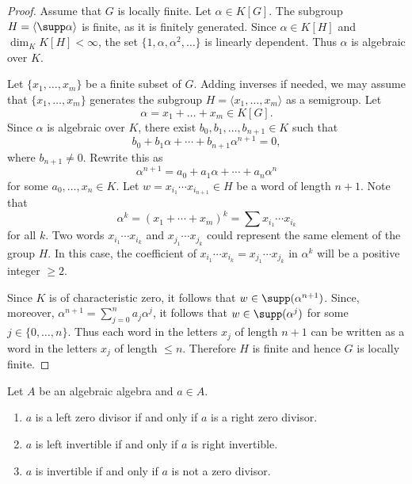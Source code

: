 \begin{proof}
	Assume that $G$ is locally finite. Let $\alpha\in K[G]$. The subgroup 
	$H=\langle\supp\alpha\rangle$ is finite, as it is finitely generated. Since 
	$\alpha\in K[H]$ and $\dim_KK[H]<\infty$, the set 
	$\{1,\alpha,\alpha^2,\dots\}$ is linearly dependent. Thus $\alpha$ is
	algebraic over $K$.

	Let $\{x_1,\dots,x_m\}$ be a finite subset of $G$. Adding inverses if needed,
	we may assume that $\{x_1,\dots,x_m\}$ generates the subgroup 
	$H=\langle x_1,\dots,x_m\rangle$ as a semigroup. Let 
	\[
	\alpha=x_1+\dots+x_m\in K[G].
	\]
	Since $\alpha$ is algebraic over $K$, 
	there exist $b_0,b_1,\dots,b_{n+1}\in K$ such that 
	\[
	b_0+b_1\alpha+\cdots+b_{n+1}\alpha^{n+1}=0,
	\]
	where $b_{n+1}\ne 0$. Rewrite this as 
	\[
		\alpha^{n+1}=a_0+a_1\alpha+\cdots+a_n\alpha^n
	\]
	for some $a_0,\dots,x_n\in K$. Let $w=x_{i_1}\cdots
	x_{i_{n+1}}\in H$ be a word of length $n+1$. 
	Note that 
	\[
		\alpha^{k}=(x_1+\cdots+x_m)^{k}
		=\sum x_{i_1}\cdots x_{i_{k}}
	\]
	for all $k$. 
	Two words $x_{i_1}\cdots x_{i_{k}}$ and 
	$x_{j_1}\cdots x_{j_{k}}$ could represent the same element of the group $H$. In this case, 
	the coefficient of $x_{i_1}\cdots x_{i_{k}}=x_{j_1}\cdots x_{j_{k}}$ 
	in $\alpha^{k}$ will be a positive integer $\geq2$.  
	
	Since $K$
	is of characteristic zero, it follows that $w\in\supp(\alpha^{n+1})$. Since, moreover,  
	$\alpha^{n+1}=\sum_{j=0}^na_j\alpha^j$, it follows that 
	$w\in\supp(\alpha^j)$ for some $j\in\{0,\dots,n\}$. Thus each
	word in the letters $x_j$ of length $n+1$ can be written as a word in the letters $x_j$ of 
	length $\leq n$. Therefore $H$ is finite and hence $G$ is locally finite. 
\end{proof}


\begin{exercise}
\label{xca:invertible_algebraic}
	Let $A$ be an algebraic algebra and $a\in A$.
	\begin{enumerate}
		\item $a$ is a left zero divisor if and only if $a$ is a right zero divisor.
		\item $a$ is left invertible if and only if $a$ is right invertible.
		\item $a$ is invertible if and only if $a$ is not a zero divisor.
	\end{enumerate}
\end{exercise}

